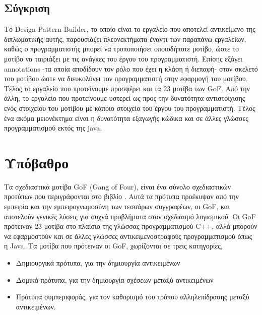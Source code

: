 \subsection{Σύγκριση}
\label{subsec:compare}
Το Design Pattern Builder, το οποίο είναι το εργαλείο που αποτελεί αντικείμενο της διπλωματικής αυτής, παρουσιάζει πλεονεκτήματα έναντι των παραπάνω εργαλείων,
καθώς ο προγραμματιστής μπορεί να τροποποιήσει οποιοδήποτε μοτίβο, ώστε το μοτίβο να ταιριάξει με τις ανάγκες του έργου του προγραμματιστή. 
Επίσης εξάγει annotations -τα οποία αποδίδουν τον ρόλο που έχει η κλάση ή διεπαφή-  στον σκελετό του μοτίβου ώστε 
να διευκολύνει τον προγραμματιστή στην εφαρμογή του μοτίβου. Τέλος το εργαλείο που προτείνουμε προσφέρει και τα 23 μοτίβα 
των GoF\textsubscript{\cite{GoF}}.
\linebreak
\linebreak
Από την άλλη, το εργαλείο που προτείνουμε υστερεί ως προς την δυνατότητα αντιστοίχισης 
ενός στοιχείου του μοτίβου με κάποιο στοιχείο του έργου του προγραμματιστή. Τέλος ένα ακόμα μειονέκτημα 
είναι η δυνατότητα εξαγωγής κώδικα και σε άλλες γλώσσες προγραμματισμού εκτός της java.
\section{Υπόβαθρο}
\label{sec:background}
Τα σχεδιαστικά μοτίβα GoF (Gang of Four), είναι ένα σύνολο σχεδιαστικών προτύπων που περιγράφονται στο βιβλίο \cite{GoF}.
Αυτά τα πρότυπα προέκυψαν από την εμπειρία και την εμπειρογνωμοσύνη των τεσσάρων συγγραφέων, οι GoF, και αποτελούν γενικές λύσεις 
για συχνά προβλήματα στον σχεδιασμό λογισμικού. Οι GoF πρότειναν 23 μοτίβα στο πλαίσιο της γλώσσας προγραμματισμού C++, αλλά μπορούν 
να εφαρμοστούν και σε άλλες γλώσσες αντικειμενοστραφούς προγραμματισμού όπως η Java. Τα μοτίβα που πρότειναν οι GoF, 
χωρίζονται σε τρεις κατηγορίες, 
\begin{itemize}
    \item Δημιουργικά πρότυπα, για την δημιουργία αντικειμένων
    \item Δομικά πρότυπα, για την δημιουργία σχέσεων μεταξύ αντικειμένων
    \item Πρότυπα συμπεριφοράς, για τον καθορισμό του τρόπου αλληλεπίδρασης μεταξύ αντικειμένων.
\end{itemize}